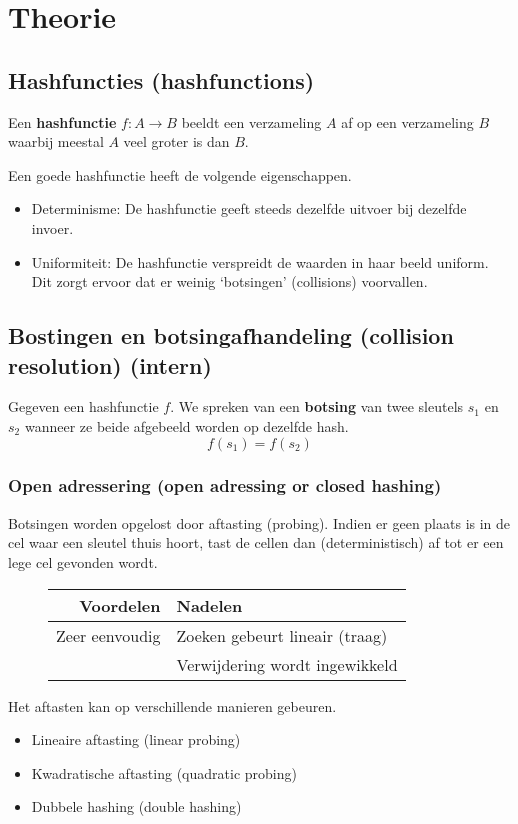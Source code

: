 \documentclass[hashing.tex]{subfiles}
\begin{document}
\chapter{Theorie}


\section{Hashfuncties (hashfunctions)}
\begin{de}
Een \textbf{hashfunctie} $f:A\rightarrow B$ beeldt een verzameling $A$ af op een verzameling $B$ waarbij meestal $A$ veel groter is dan $B$.
\end{de}
Een goede hashfunctie heeft de volgende eigenschappen.
\begin{itemize}
\item Determinisme: De hashfunctie geeft steeds dezelfde uitvoer bij dezelfde invoer.
\item Uniformiteit: De hashfunctie verspreidt de waarden in haar beeld uniform. Dit zorgt ervoor dat er weinig `botsingen' (collisions) voorvallen.
\end{itemize}

\section{Bostingen en botsingafhandeling (collision resolution) (intern)}
\begin{de}
Gegeven een hashfunctie $f$. We spreken van een \textbf{botsing} van twee sleutels $s_1$ en $s_2$ wanneer ze beide afgebeeld worden op dezelfde hash.
\[
f(s_1) = f(s_2)
\]
\end{de}
\subsection{Open adressering (open adressing or closed hashing)}
Botsingen worden opgelost door aftasting (probing). Indien er geen plaats is in de cel waar een sleutel thuis hoort, tast de cellen dan (deterministisch) af tot er een lege cel gevonden wordt. 
\begin{figure}[H]
\centering
\begin{tabular}{r|l}
Voordelen & Nadelen\\
\hline
Zeer eenvoudig & Zoeken gebeurt lineair (traag)\\
& Verwijdering wordt ingewikkeld
\end{tabular}
\end{figure}
Het aftasten kan op verschillende manieren gebeuren.
\begin{itemize}
\item Lineaire aftasting (linear probing)
\item Kwadratische aftasting (quadratic probing)
\item Dubbele hashing (double hashing)
\end{itemize}
\end{document}
